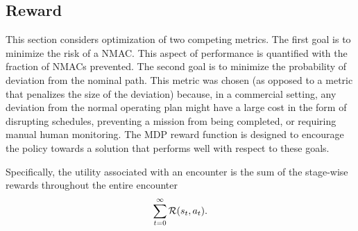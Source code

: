 \subsection{Reward}\label{sec:rew}

This section considers optimization of two competing metrics. The first goal is to minimize the risk of a NMAC. This aspect of performance is quantified with the fraction of NMACs prevented. The second goal is to minimize the probability of deviation from the nominal path. This metric was chosen (as opposed to a metric that penalizes the size of the deviation) because, in a commercial setting, any deviation from the normal operating plan might have a large cost in the form of disrupting schedules, preventing a mission from being completed, or requiring manual human monitoring. The MDP reward function is designed to encourage the policy towards a solution that performs well with respect to these goals.  

Specifically, the utility associated with an encounter is the sum of the stage-wise rewards throughout  the entire encounter
\begin{equation}\label{eqn:encrew}
    \sum_{t=0}^\infty \mathcal{R}(s_t, a_t) \text{.}
\end{equation}


